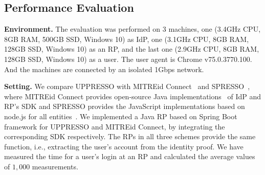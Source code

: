 \subsection{Performance Evaluation}
\label{sec:evaluation}
\noindent\textbf{Environment.} The evaluation was performed on 3 machines,
one (3.4GHz CPU, 8GB RAM, 500GB SSD, Windows 10) as IdP,
one (3.1GHz CPU, 8GB RAM, 128GB SSD, Windows 10) as an RP,
and the last one (2.9GHz CPU, 8GB RAM, 128GB SSD, Windows 10) as a user.
The user agent is Chrome v75.0.3770.100.
And the machines are connected by an isolated 1Gbps network.



\noindent\textbf{Setting.}
We compare UPPRESSO with MITREid Connect~\cite{MITREid} and SPRESSO~\cite{SPRESSO},
where MITREid Connect provides open-source Java implementations~\cite{MITREid} of IdP and RP's SDK and SPRESSO provides the JavaScript implementations based on node.js for all entities~\cite{SPRESSO}.
We implemented a Java RP based on Spring Boot framework for UPPRESSO and MITREid Connect, by integrating the corresponding SDK respectively.
The RPs in all three schemes provide the same function, i.e.,   extracting the user's account from the identity proof.
We have measured the time for a user's login at an RP and calculated the average values of $1,000$ measurements.

